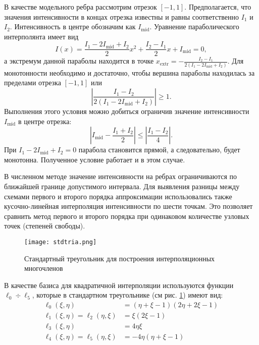 В качестве модельного ребра рассмотрим отрезок $[-1, 1]$. Предполагается, что значения интенсивности в концах отрезка известны и равны соответственно $I_1$ и $I_2$. Интенсивность в центре обозначим как $I_\text{mid}$. Уравнение параболического интерполянта имеет вид
\begin {equation}
I(x) = \frac{I_1 - 2I_\text{mid} + I_2}{2}x^2 + \frac{I_2 - I_1}{2} x + I_\text{mid} = 0, 
\end {equation}
а экстремум данной параболы находится в точке $x_{\text{extr}} = -\frac{I_2 - I_1}{2(I_1 - 2I_\text{mid} + I_2)}$.
Для монотонности необходимо и достаточно, чтобы вершина параболы находилась за пределами отрезка $[-1,1]$ или
\begin {equation}
\left| \frac{I_1 - I_2}{2(I_1 - 2I_\text{mid} + I_2)}\right| \geqslant 1.
\end {equation}
Выполнения этого условия можно добиться ограничив значение интенсивности $I_\text{mid}$ в центре отрезка:
\begin {equation}
\left| I_\text{mid} - \frac{I_1 + I_2}{2}\right| \leqslant \left| \frac{I_1 - I_2}{4}\right| .
\end {equation}
При $I_1 - 2I_\text{mid} + I_2 = 0$ парабола становится прямой, а следовательно, будет монотонна. Полученное условие работает и в этом случае.

В численном методе значение интенсивности на ребрах ограничиваются по ближайшей границе допустимого интервала. Для выявления разницы между схемами первого и второго порядка аппроксимации использовались также кусочно-линейная интерполяция интенсивности по шести точкам. Это позволяет сравнить метод первого и второго порядка при одинаковом количестве узловых точек (степеней свободы). 

\begin{figure}[ht!]
\centering
\texttt{[image: stdtria.png]}
\caption{Стандартный треугольник для построения интерполяционных многочленов}
\label{fig:stdtria}
\end{figure}
В качестве базиса для квадратичной интерполяции используются функции $\ell_0 \div \ell_5$, которые в стандартном треугольнике (см рис. \ref{fig:stdtria}) имеют вид:
\begin {equation}
\begin {aligned}
\ell_0 (\xi, \eta)&= (\eta + \xi -1)(2\eta + 2\xi - 1) \\
\ell_1 (\xi, \eta) = \ell_2 (\eta, \xi)&= \xi(2\xi - 1) \\
\ell_3 (\xi, \eta)&= 4\eta\xi \\
\ell_4 (\xi, \eta) = \ell_5(\eta, \xi)&= -4\eta(\eta + \xi - 1)
\end {aligned}
\end {equation}

